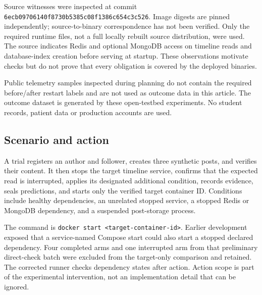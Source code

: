 \documentclass[manuscript,review,nonacm]{acmart}
\begin{document}
Source witnesses were inspected at commit \texttt{6ecb09706140f8730b5385c08f1386c654c3c526}. Image digests are pinned independently; source-to-binary correspondence has not been verified. Only the required runtime files, not a full locally rebuilt source distribution, were used. The source indicates Redis and optional MongoDB access on timeline reads and database-index creation before serving at startup. These observations motivate checks but do not prove that every obligation is covered by the deployed binaries.

Public telemetry samples inspected during planning do not contain the required before/after restart labels and are not used as outcome data in this article. The outcome dataset is generated by these open-testbed experiments. No student records, patient data or production accounts are used.

\subsection{Scenario and action}
A trial registers an author and follower, creates three synthetic posts, and verifies their content. It then stops the target timeline service, confirms that the expected read is interrupted, applies its designated additional condition, records evidence, seals predictions, and starts only the verified target container ID. Conditions include healthy dependencies, an unrelated stopped service, a stopped Redis or MongoDB dependency, and a suspended post-storage process.

The command is \texttt{docker start <target-container-id>}. Earlier development exposed that a service-named Compose start could also start a stopped declared dependency. Four completed arms and one interrupted arm from that preliminary direct-check batch were excluded from the target-only comparison and retained. The corrected runner checks dependency states after action. Action scope is part of the experimental intervention, not an implementation detail that can be ignored.
\end{document}
